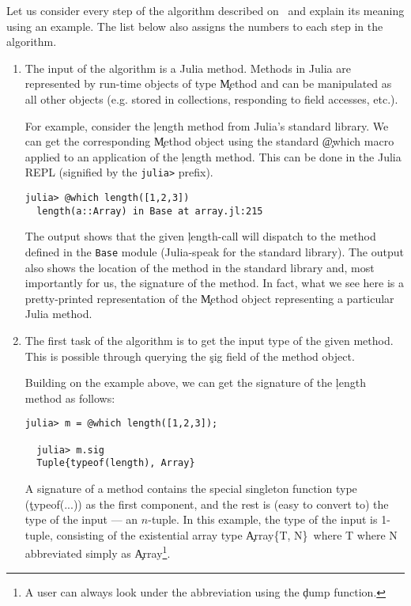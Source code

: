 \documentclass[sigplan,screen]{acmart}
\begin{document}
Let us consider every step of the algorithm described
on~ and explain its meaning using an example.
The list below also assigns the numbers to each step in the algorithm.
\begin{enumerate}

  \item The input of the algorithm is a Julia method. Methods in Julia are
  represented by run-time objects of type \c{Method} and can be manipulated as
  all other objects (e.g. stored in collections, responding to field accesses, etc.).

  For example, consider the \c{length} method from Julia's standard library. We can
  get the corresponding \c{Method} object using the standard \c{@which} macro
  applied to an application of the \c{length} method. This can be done in the
  Julia REPL (signified by the \texttt{julia>} prefix).

\begin{minipage}{.92\columnwidth}
\begin{lstlisting}[style=jterm]
  julia> @which length([1,2,3])
  length(a::Array) in Base at array.jl:215
\end{lstlisting}
\end{minipage}

  The output shows that the given \c{length}-call will dispatch to the
  method defined in the \texttt{Base} module (Julia-speak for the standard
  library). The output also shows the location of the method in the
  standard library and, most importantly for us, the signature of the
  method. In fact, what we see here is a pretty-printed representation of
  the \c{Method} object representing a particular Julia method.

  \item The first task of the algorithm is to get the input type of the given
  method. This is possible through querying the \c{sig} field of the method object.

  Building on the example above, we can get the signature of the \c{length}
  method as follows:

\begin{minipage}{.92\columnwidth}
\begin{lstlisting}[style=jterm]
  julia> m = @which length([1,2,3]);

  julia> m.sig
  Tuple{typeof(length), Array}
\end{lstlisting}
\end{minipage}

  A signature of a method
  contains the special singleton function
  type (\c{typeof(...)}) as the first component, and the rest is (easy to
  convert to) the type of the input --- an $n$-tuple. In this example, the type of
  the input is 1-tuple, consisting of the existential array type
  \c{Array\{T, N\}\ where T where N} abbreviated simply as \c{Array}\footnote{%
A user can always look under the abbreviation using the \c{dump} function.}.


\end{enumerate}
\end{document}
